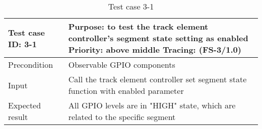 \begin{table}[H]
	\caption{Test case 3-1}
	\label{table:TCase-FS3-01}
	\begin{center}
		\renewcommand{\arraystretch}{1.8}
		\begin{tabu} 
			to 0.9 \textwidth
			{  X[0.3, l] X[l] }
			\toprule
			Test case ID: 3-1 & Purpose: to test the track element controller's segment state setting as enabled \newline Priority: above middle \newline Tracing: (FS-3/1.0) \\ \midrule
			Precondition      & Observable GPIO components                                                                                                                    \\
			Input             & Call the track element controller set segment state function with enabled parameter                                                           \\
			Expected result   & All GPIO levels are in "HIGH" state, which are related to the specific segment                                                                \\ \bottomrule
		\end{tabu}
	\end{center}
\end{table}

